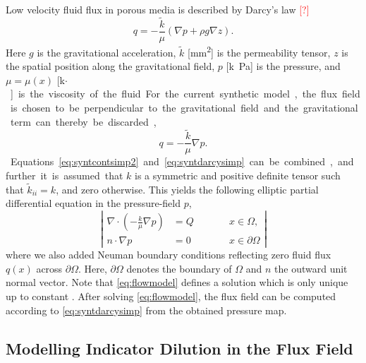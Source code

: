 \documentclass[paper=a4, fontsize=11pt,parskip=half,headings=small]{scrartcl}
\newcommand{\missingsource}{\textcolor{red}{[?]}}
\begin{document}
	Low velocity fluid flux in porous media is described by Darcy's law \missingsource
	\begin{equation}
		q = -\frac{\tilde{k}}{\mu} \left( \nabla p + \rho g  \nabla z \right).
	\end{equation}
	Here $g$ is the gravitational acceleration, $\tilde{k}$ [\si{\square\milli\meter}] is the permeability tensor, $z$ is the spatial position along the gravitational field, $p$ [\si{k\pascal}] is the pressure, and $\mu = \mu(x)$ [\si{k\pascal$\cdot$\second}] is the viscosity of the fluid.
	For the current synthetic model, the flux field is chosen to be perpendicular to the gravitational field and the gravitational term can thereby be discarded,
	\begin{equation}
		q = -\frac{\tilde{k}}{\mu} \nabla p.
		\label{eq:syntdarcysimp}
	\end{equation}
	Equations \eqref{eq:syntcontsimp2} and \eqref{eq:syntdarcysimp} can be combined, and further it is assumed that $k$ is a symmetric and positive definite tensor such that $\tilde{k}_{ii} = k$, and zero otherwise.
	This yields the following elliptic partial differential equation in the pressure-field $p$,
	\begin{equation}
		\left\vert
		\begin{alignedat}{2}
			\nabla \cdot \left( -\frac{k}{\mu} \nabla p \right) &= Q  \qquad &&x \in \Omega, \\
			n \cdot \nabla p &=0 &&x \in \partial \Omega
		\end{alignedat}
		\right\vert 
		\label{eq:flowmodel}
	\end{equation}
	where we also added Neuman boundary conditions reflecting zero fluid flux $q(x)$ across $\partial \Omega$.
	Here, $\partial \Omega$ denotes the boundary of $\Omega$ and $n$ the outward unit normal vector. 
	Note that \eqref{eq:flowmodel} defines a solution which is only unique up to constant \cite{evans98}.
	After solving \eqref{eq:flowmodel}, the flux field can be computed according to \eqref{eq:syntdarcysimp} from the obtained pressure map. 
	
	
	\subsection{Modelling Indicator Dilution in the Flux Field}\label{sec:transport}
	
\end{document}
